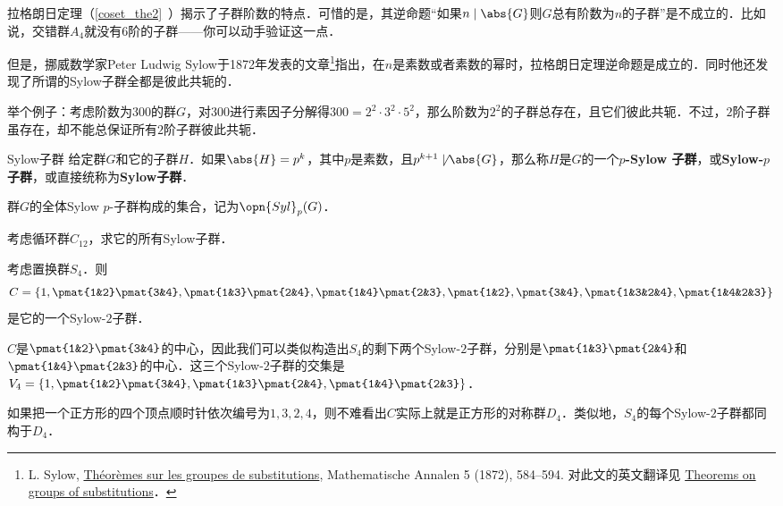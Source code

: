 



拉格朗日定理（\autoref{coset_the2}~）揭示了子群阶数的特点．可惜的是，其逆命题“如果$n\mid \abs{G}$则$G$总有阶数为$n$的子群”是不成立的．比如说，交错群$A_4$就没有$6$阶的子群——你可以动手验证这一点．

但是，挪威数学家Peter Ludwig Sylow于1872年发表的文章\footnote{L. Sylow, \href{https://eudml.org/doc/156588}{Théorèmes sur les groupes de substitutions}, Mathematische Annalen 5 (1872), 584–594. 对此文的英文翻译见 \href{http://www.maths.qmul.ac.uk/~raw/pubs_files/Sylow.pdf}{Theorems on groups of substitutions}．}指出，在$n$是素数或者素数的幂时，拉格朗日定理逆命题是成立的．同时他还发现了所谓的Sylow子群全都是彼此共轭的．

举个例子：考虑阶数为$300$的群$G$，对$300$进行素因子分解得$300=2^2\cdot 3^2\cdot 5^2$，那么阶数为$2^2$的子群总存在，且它们彼此共轭．不过，$2$阶子群虽存在，却不能总保证所有$2$阶子群彼此共轭．


\begin{definition}{Sylow子群}\label{Sylow_def1}
给定群$G$和它的子群$H$．如果$\abs{H}=p^k$，其中$p$是素数，且$p^{k+1}\not\mid\abs{G}$，那么称$H$是$G$的一个$p$\textbf{-Sylow 子群}，或\textbf{Sylow-}$p$\textbf{子群}，或直接统称为\textbf{Sylow子群}．

群$G$的全体Sylow $p$-子群构成的集合，记为$\opn{Syl}_p(G)$．
\end{definition}



\begin{exercise}{}
考虑循环群$C_{12}$，求它的所有Sylow子群．
\end{exercise}

\begin{example}{}
考虑置换群$S_4$．则
\begin{equation}
C=\{1, \pmat{1&2}\pmat{3&4}, \pmat{1&3}\pmat{2&4}, \pmat{1&4}\pmat{2&3}, \pmat{1&2}, \pmat{3&4}, \pmat{1&3&2&4}, \pmat{1&4&2&3}\}
\end{equation}
是它的一个Sylow-$2$子群．

$C$是$\pmat{1&2}\pmat{3&4}$的中心，因此我们可以类似构造出$S_4$的剩下两个Sylow-$2$子群，分别是$\pmat{1&3}\pmat{2&4}$和$\pmat{1&4}\pmat{2&3}$的中心．这三个Sylow-$2$子群的交集是$V_4=\{1, \pmat{1&2}\pmat{3&4}, \pmat{1&3}\pmat{2&4}, \pmat{1&4}\pmat{2&3}\}$．

如果把一个正方形的四个顶点顺时针依次编号为$1, 3, 2, 4$，则不难看出$C$实际上就是正方形的对称群$D_4$．类似地，$S_4$的每个Sylow-$2$子群都同构于$D_4$．

\end{example}

